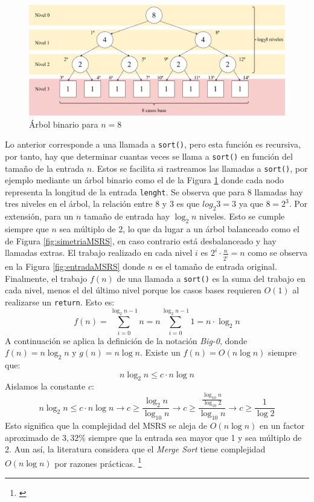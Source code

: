 \documentclass[titlepage]{article}
\begin{document}
\begin{figure}[hbtp]
    \centering
    \includegraphics[width=0.8\linewidth]{Diagrames/arbolBinarioMSRSn8.png}
    \caption{Árbol binario para \(n=8\)}
    \label{fig:arbol-MSRS-N=8}
\end{figure}

Lo anterior corresponde a una llamada a \lstinline|sort()|, pero esta función es recursiva, por tanto, hay que determinar cuantas veces se llama a \lstinline|sort()| en función del tamaño de la entrada \(n\). Estos se facilita si rastreamos las llamadas a \lstinline|sort()|, por ejemplo mediante un árbol binario como el de la Figura \ref{fig:arbol-MSRS-N=8} donde cada nodo representa la longitud de la entrada \lstinline|lenght|. Se observa que para 8 llamadas hay tres niveles en el árbol, la relación entre 8 y 3 es que \(log_{2}{3} = 3\) ya que \(8=2^3\). Por extensión, para un \(n\) tamaño de entrada hay \(\log_{2}{n}\) niveles. Esto se cumple siempre que \(n\) sea múltiplo de 2, lo que da lugar a un árbol balanceado como el de Figura \ref{fig:simetriaMSRS}, en caso contrario está desbalanceado y hay llamadas extras. El trabajo realizado en cada nivel \(i\) es \(2^i\cdot \frac{n}{2^i} = n\) como se observa en la Figura \ref{fig:entradaMSRS} donde \(n\) es el tamaño de entrada original. Finalmente, el trabajo \(f(n)\) de una llamada a \lstinline{sort()} es la suma del trabajo en cada nivel, menos el del último nivel porque los casos bases requieren \(O(1)\) al realizarse un \lstinline{return}. Esto es:
\[f(n) = \sum_{i=0}^{\log_{2}{n} -1} {n} = n\sum_{i=0}^{\log_{2}{n} -1} {1} = n\cdot\log_{2}{n}\]
A continuación se aplica la definición de la notación \textit{Big-0}, donde \(f(n)=n\log_{2}{n}\) y \(g(n)=n\log{n}\). Existe un \(f(n)=O(n\log{n})\) siempre que: 
\[n\log_{2}{n} \leq c\cdot n\log{n}\]
Aislamos la constante \(c\):
\[n\log_{2}{n} \leq c\cdot n\log{n} \longrightarrow c \geq \frac{\log_{2}{n}} {\log_{10}{n}} \longrightarrow c \geq \frac{ \frac{\log_{10}{n}} {\log_{10}{2}} } {\log_{10}{n}} \longrightarrow c \geq \frac{1}{\log{2}} \]
Esto significa que la complejidad del MSRS se aleja de \(O(n\log{n})\) en un factor aproximado de \(3,32\%\) siempre que la entrada sea mayor que 1 y sea múltiplo de 2. Aun así, la literatura considera que el \textit{Merge Sort} tiene complejidad \(O(n\log{n})\) por razones prácticas. \footnote{\cite{Sedgewick2003-cd}}
\end{document}
